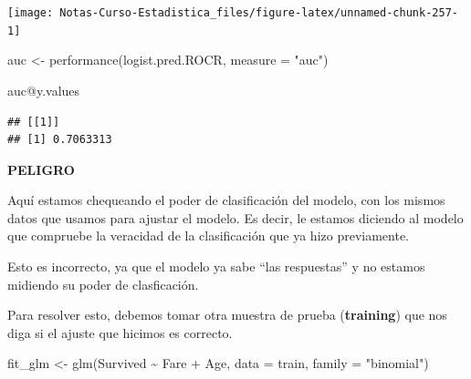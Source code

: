 \documentclass[
  12pt,
]{book}
\newenvironment{Shaded}{\begin{snugshade}}{\end{snugshade}}
\newcommand{\AttributeTok}[1]{\textcolor[rgb]{0.77,0.63,0.00}{#1}}
\newcommand{\DecValTok}[1]{\textcolor[rgb]{0.00,0.00,0.81}{#1}}
\newcommand{\FloatTok}[1]{\textcolor[rgb]{0.00,0.00,0.81}{#1}}
\newcommand{\FunctionTok}[1]{\textcolor[rgb]{0.00,0.00,0.00}{#1}}
\newcommand{\NormalTok}[1]{#1}
\newcommand{\OtherTok}[1]{\textcolor[rgb]{0.56,0.35,0.01}{#1}}
\newcommand{\SpecialCharTok}[1]{\textcolor[rgb]{0.00,0.00,0.00}{#1}}
\newcommand{\StringTok}[1]{\textcolor[rgb]{0.31,0.60,0.02}{#1}}
\theoremstyle{definition}
\theoremstyle{definition}
\theoremstyle{definition}
\theoremstyle{remark}
\begin{document}
\begin{center}\texttt{[image: Notas-Curso-Estadistica\_files/figure-latex/unnamed-chunk-257-1]} \end{center}

\begin{Shaded}
\begin{Highlighting}[]
\NormalTok{auc }\OtherTok{\textless{}{-}} \FunctionTok{performance}\NormalTok{(logist.pred.ROCR, }\AttributeTok{measure =} \StringTok{"auc"}\NormalTok{)}

\NormalTok{auc}\SpecialCharTok{@}\NormalTok{y.values}
\end{Highlighting}
\end{Shaded}

\begin{verbatim}
## [[1]]
## [1] 0.7063313
\end{verbatim}

\textbf{PELIGRO}

Aquí estamos chequeando el poder de clasificación del modelo, con los mismos datos que usamos para ajustar el modelo. Es decir, le estamos diciendo al modelo que compruebe la veracidad de la clasificación que ya hizo previamente.

Esto es incorrecto, ya que el modelo ya sabe ``las respuestas'' y no estamos midiendo su poder de clasficación.

Para resolver esto, debemos tomar otra muestra de prueba (\textbf{training}) que nos diga si el ajuste que hicimos es correcto.

\begin{Shaded}
\end{Shaded}

\begin{Shaded}
\begin{Highlighting}[]
\NormalTok{fit\_glm }\OtherTok{\textless{}{-}} \FunctionTok{glm}\NormalTok{(Survived }\SpecialCharTok{\textasciitilde{}}\NormalTok{ Fare }\SpecialCharTok{+}\NormalTok{ Age, }\AttributeTok{data =}\NormalTok{ train, }
    \AttributeTok{family =} \StringTok{"binomial"}\NormalTok{)}
\end{Highlighting}
\end{Shaded}
\end{document}
